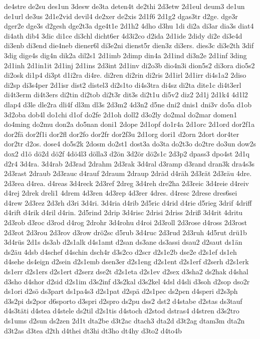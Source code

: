 {de4stre
de2su
des1un
3desw
de3ta
deten4t
de2thi
2d3etw
2d1eul
deum3
de1un
de1url
de3us
2d1e2vid
devil4
de2xer
de2xis
2d1f6
2d1g2
dgas3tr
d2ge.
dge3r
dger2e
dge3s
d2gesh
dge2t3a
dge4t1e
2d1h2
4dho
d3hu
1di
di2a
di3ar
dia3s
diat4
di4ath
dib4
3dic
di1ce
di3chl
dicht6er
4d3i2co
d2ida
2d1ide
2didy
di2e
di3e4d
di3enb
di3end
die4neb
diener6l
di3e2ni
dienst5r
dien3z
di3ers.
dies3c
di3e2th
3dif
3dig
dige4s
dig4n
dik2a
dil2s1
2d1imb
2dimp
din4a
2d1ind
di3n2e
2d1inf
3ding
2d1inh
2d1in1it
2d1inj
2d1ins
2d3int
2d1inv
di2o3b
dio4n3i
dion5s2
di3ora
dio5s2
di2osk
di1p4
di3pt
d1i2ra
di4re.
di2ren
di2rin
di2ris
2d1irl
2d1irr
di4s1a2
2diso
di2sp
di3s4per
2d1isr
dist2
distel3
di2s1to
di4s3tra
di4sz
di2ta
dite1c
di4t3erl
di4t3erm
di4t3ers
di2tin
di2tob
di2t3r
dit3s
di2t1u
di5v2
diz2
2d1j
2d1k4
4d1l2
dlap4
d3le
dle2ra
dli4f
dl3m
dl3s
2d3m2
4d3n2
d5ne
dni2
dnis1
dni3v
do5a
d1ob
3d2oba
dob4l
do1chi
d1of
do2fe
2d1oh
doll2
d3o2ly
do2mal
do2mar
domen1
do4ming
do2mu
don2a
do5nan
doni1
2dope
2d1opf
do1r4a
2d1orc
2d1ord
dor2f1a
dor2fä
dor2f1i
dor2fl
dor2fo
dor2fr
dor2f3u
2d1org
dori1
d2orn
2dort
dor4ter
dor2tr
d2os.
dose4
do5s2k
2dosm
do2st1
dost3a
do3ta
do2t3o
do2tre
do3un
dow2s
dox2
d1ö
dö2d
dö2f
4dö4l3
dölla3
d2ön
3d2ör
dö2s1c
2d3p2
dpass3
dpo4st
2d1q
d2r4
3d4ra.
3d4rab
2d3rad
2drahm
2d3rak
3d4ral
d3ramp
d3rand
dran3k
dra4s3s
2d3rast
2draub
2d3rauc
d4rauf
2draum
2draup
2dräd
d4räh
2d3rät
2d3räu
4dre.
2d3rea
d4rea.
d4reas
3d4reck
2d3ref
2dreg
3d4reh
dre2ha
2d3reic
3d4reie
d4reiv
d4rej
2drek
dreli1
4drem
4d3ren
4d3rep
4d3rer
4dres.
d4resc
2drese
dres6sei
d4rew
2d3rez
2d3rh
d3ri
3d4ri.
3d4ria
d4rib
2d5ric
d4rid
d4rie
d5rieg
3drif
4driff
d4rift
d4rik
d4ril
d4rin.
2d5rind
2drip
3d4risc
2drisi
2driss
2driß
3d4rit
4dritu
2d3rob
d3roc
d3rod
d4rog
2drohr
3d4rohu
d4roi
2d3roll
2d3rose
d4ross
2d3rost
2d3rot
2d3rou
2d3rov
d3row
drö2sc
d5rub
3d4ruc
2d3rud
2d3ruh
4d5rut
drü1b
3d4rüs
2d1s
ds3ab
d2s1alk
d4s1amt
d2san
ds3ane
ds3assi
dsau2
d2saut
ds1än
ds2äu
4dsb
d4schef
d4schin
dsch4r
d3s2co
d2scr
d2s1e2b
dse2e
d2s1ef
ds1eh
d4sehe
ds4eign
d2sein
d2s1emb
dsen3er
d2s1eng
d2s1ent
d2s1erf
d2serh
d2s1erk
ds1err
d2s1ers
d2s1ert
d2serz
dse2t
d2s1eta
d2s1ev
d2sex
d3sha2
ds2hak
d4shal
d3sho
d4shor
d2sid
d2s1im
d3s2inf
d3s2kal
d3s2kel
4dsl
d4sli
d3soh
d2sop
dso2r
ds1ori
d2sö
ds3part
ds1pa4s3
d2s1pat
d2spä
d2s1pec
ds2pen
d4speri
d2s3ph
d3s2pi
ds2por
d6sporto
d3spri
d2spro
ds2pu
dss2
dst2
d4stabe
d2stas
ds3tauf
d4s3täti
d4stea
d4stele
ds2til
d2s1tis
d4stoch
d2stod
dstras4
d4stren
d3s2tro
ds1ums
d2sun
ds2zen
2d1t
dta2be
d3t2ac
dtach3
dta2d
d3t2ag
dtam3m
dta2n
d3t2as
d3tea
d2th
d4thei
dt3hi
dt3ho
dt4hy
d3to2
d4to4b
}
